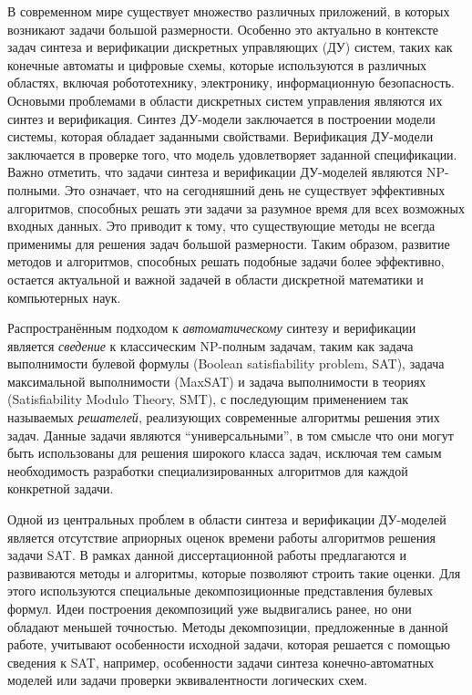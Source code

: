 {\actuality}
В современном мире существует множество различных приложений, в которых возникают задачи большой размерности.
Особенно это актуально в контексте задач синтеза и верификации дискретных управляющих (ДУ) систем, таких как конечные автоматы и цифровые схемы, которые используются в различных областях, включая робототехнику, электронику, информационную безопасность.
Основыми проблемами в области дискретных систем управления являются их синтез и верификация.
Синтез ДУ-модели заключается в построении модели системы, которая обладает заданными свойствами.
Верификация ДУ-модели заключается в проверке того, что модель удовлетворяет заданной спецификации.
Важно отметить, что задачи синтеза и верификации ДУ-моделей являются NP-полными.
Это означает, что на сегодняшний день не существует эффективных алгоритмов, способных решать эти задачи за разумное время для всех возможных входных данных.
Это приводит к тому, что существующие методы не всегда применимы для решения задач большой размерности.
Таким образом, развитие методов и алгоритмов, способных решать подобные задачи более эффективно, остается актуальной и важной задачей в области дискретной математики и компьютерных наук.

Распространённым подходом к \emph{автоматическому} синтезу и верификации является \emph{сведение} к классическим NP-полным задачам, таким как задача выполнимости булевой формулы (Boolean satisfiability problem, SAT), задача максимальной выполнимости (MaxSAT) и задача выполнимости в теориях (Satisfiability Modulo Theory, SMT), с последующим применением так называемых \emph{решателей}, реализующих современные алгоритмы решения этих задач.
Данные задачи являются \enquote{универсальными}, в том смысле что они могут быть использованы для решения широкого класса задач, исключая тем самым необходимость разработки специализированных алгоритмов для каждой конкретной задачи.

Одной из центральных проблем в области синтеза и верификации ДУ-моделей является отсутствие априорных оценок времени работы алгоритмов решения задачи SAT.
В рамках данной диссертационной работы предлагаются и развиваются методы и алгоритмы, которые позволяют строить такие оценки.
Для этого используются специальные декомпозиционные представления булевых формул.
Идеи построения декомпозиций уже выдвигались ранее, но они обладают меньшей точностью.
Методы декомпозиции, предложенные в данной работе, учитывают особенности исходной задачи, которая решается с помощью сведения к SAT, например, особенности задачи синтеза конечно-автоматных моделей или задачи проверки эквивалентности логических схем.

